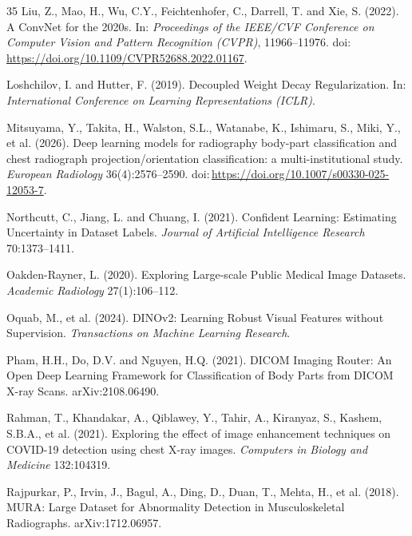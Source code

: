 \begin{thebibliography}{35}
Liu, Z., Mao, H., Wu, C.Y., Feichtenhofer, C., Darrell, T. and Xie, S. (2022). A ConvNet for the 2020s. In: \textit{Proceedings of the IEEE/CVF Conference on Computer Vision and Pattern Recognition (CVPR)}, 11966--11976. doi:\,\url{https://doi.org/10.1109/CVPR52688.2022.01167}.

Loshchilov, I. and Hutter, F. (2019). Decoupled Weight Decay Regularization. In: \textit{International Conference on Learning Representations (ICLR)}.

Mitsuyama, Y., Takita, H., Walston, S.L., Watanabe, K., Ishimaru, S., Miki, Y., et al. (2026). Deep learning models for radiography body-part classification and chest radiograph projection/orientation classification: a multi-institutional study. \textit{European Radiology} 36(4):2576--2590. doi:\,\url{https://doi.org/10.1007/s00330-025-12053-7}.

Northcutt, C., Jiang, L. and Chuang, I. (2021). Confident Learning: Estimating Uncertainty in Dataset Labels. \textit{Journal of Artificial Intelligence Research} 70:1373--1411.

Oakden-Rayner, L. (2020). Exploring Large-scale Public Medical Image Datasets. \textit{Academic Radiology} 27(1):106--112.

Oquab, M., et al. (2024). DINOv2: Learning Robust Visual Features without Supervision. \textit{Transactions on Machine Learning Research}.

Pham, H.H., Do, D.V. and Nguyen, H.Q. (2021). DICOM Imaging Router: An Open Deep Learning Framework for Classification of Body Parts from DICOM X-ray Scans. arXiv:2108.06490.

Rahman, T., Khandakar, A., Qiblawey, Y., Tahir, A., Kiranyaz, S., Kashem, S.B.A., et al. (2021). Exploring the effect of image enhancement techniques on COVID-19 detection using chest X-ray images. \textit{Computers in Biology and Medicine} 132:104319.

Rajpurkar, P., Irvin, J., Bagul, A., Ding, D., Duan, T., Mehta, H., et al. (2018). MURA: Large Dataset for Abnormality Detection in Musculoskeletal Radiographs. arXiv:1712.06957.


\end{thebibliography}
